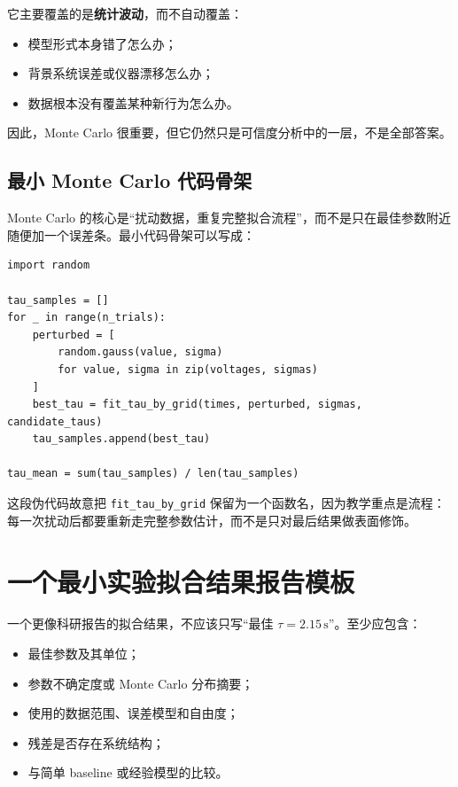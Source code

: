 它主要覆盖的是\textbf{统计波动}，而不自动覆盖：

\begin{itemize}
    \item 模型形式本身错了怎么办；
    \item 背景系统误差或仪器漂移怎么办；
    \item 数据根本没有覆盖某种新行为怎么办。
\end{itemize}

因此，Monte Carlo 很重要，但它仍然只是可信度分析中的一层，不是全部答案。

\subsection{最小 Monte Carlo 代码骨架}

Monte Carlo 的核心是“扰动数据，重复完整拟合流程”，而不是只在最佳参数附近随便加一个误差条。最小代码骨架可以写成：

\begin{examplebox}[扰动数据并重复拟合]
\begin{lstlisting}[style=pythonstyle]
import random

tau_samples = []
for _ in range(n_trials):
    perturbed = [
        random.gauss(value, sigma)
        for value, sigma in zip(voltages, sigmas)
    ]
    best_tau = fit_tau_by_grid(times, perturbed, sigmas, candidate_taus)
    tau_samples.append(best_tau)

tau_mean = sum(tau_samples) / len(tau_samples)
\end{lstlisting}
\end{examplebox}

这段伪代码故意把 \texttt{fit\_tau\_by\_grid} 保留为一个函数名，因为教学重点是流程：每一次扰动后都要重新走完整参数估计，而不是只对最后结果做表面修饰。

\section{一个最小实验拟合结果报告模板}

一个更像科研报告的拟合结果，不应该只写“最佳 $\tau=2.15\,\mathrm{s}$”。至少应包含：

\begin{itemize}
    \item 最佳参数及其单位；
    \item 参数不确定度或 Monte Carlo 分布摘要；
    \item 使用的数据范围、误差模型和自由度；
    \item 残差是否存在系统结构；
    \item 与简单 baseline 或经验模型的比较。
\end{itemize}

